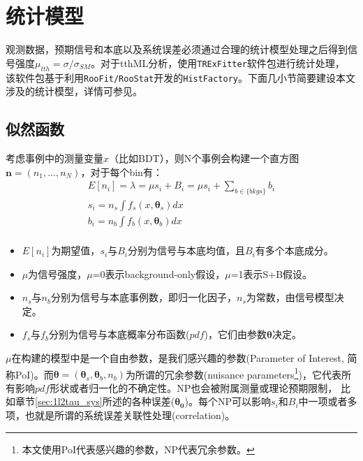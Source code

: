 \section{统计模型}\label{sec:stat_theory}
观测数据，预期信号和本底以及系统误差必须通过合理的统计模型处理之后得到信号强度$\mu_{tth}=\sigma/\sigma_{SM}$。对于tthML分析，使用\texttt{TRExFitter}\cite{TRExFitter}软件包进行统计处理，
该软件包基于利用\texttt{RooFit/RooStat}开发的\texttt{HistFactory}\cite{Cranmer:1456844}。下面几小节简要建设本文涉及的统计模型，详情可参见\cite{asym}。

\subsection{似然函数}
考虑事例中的测量变量$x$（比如BDT），则N个事例会构建一个直方图$\boldsymbol{n}=(n_1,...,n_N)$，对于每个bin有：
\begin{equation}
\begin{aligned}
 E[n_i]=\lambda=\mu s_i+B_i=\mu s_i+\sum_{b\in {\{bkgs\}}}b_i \\
 s_i=n_s\int f_s(x, \boldsymbol{\theta}_s)dx  \\
 b_i=n_b\int f_b(x, \boldsymbol{\theta}_b)dx \\
\end{aligned}
\end{equation}
\begin{itemize}
  \item $E[n_i]$为期望值，$s_i$与$B_i$分别为信号与本底均值，且$B_i$有多个本底成分。
  \item $\mu$为信号强度，$\mu$=0表示background-only假设，$\mu$=1表示S+B假设。
  \item $n_s$与$n_b$分别为信号与本底事例数，即归一化因子，$n_s$为常数，由信号模型决定。
  \item $f_s$与$f_b$分别为信号与本底概率分布函数($pdf$)，它们由参数$\boldsymbol{\theta}$决定。
\end{itemize}
$\mu$在构建的模型中是一个自由参数，是我们感兴趣的参数(Parameter of Interest, 简称PoI)。而$\boldsymbol{\theta}=(\boldsymbol{\theta}_s,\boldsymbol{\theta}_b,n_b)$为所谓的冗余参数(nuisance parameters\footnote{本文使用PoI代表感兴趣的参数，NP代表冗余参数。})，它代表所有影响$pdf$形状或者归一化的不确定性。NP也会被附属测量或理论预期限制，
比如章节\ref{sec:1l2tau_sys}所述的各种误差($\boldsymbol{\theta_0}$)。每个NP可以影响$s_i$和$B_i$中一项或者多项，也就是所谓的系统误差关联性处理(correlation)。

